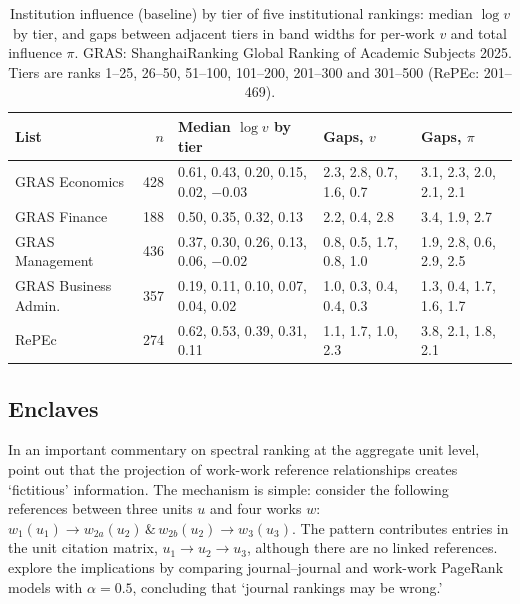 \begin{table}[!htbp]
  \centering
  \footnotesize
  \caption{Institution influence (baseline) by tier of five institutional rankings: median $\log v$ by tier, and gaps between adjacent tiers in band widths for per-work $v$ and total influence $\pi$. GRAS: ShanghaiRanking Global Ranking of Academic Subjects 2025. Tiers are ranks 1--25, 26--50, 51--100, 101--200, 201--300 and 301--500 (RePEc: 201--469).}
  \label{tab:institution_tiers}
  \setlength{\tabcolsep}{4pt}
  \begin{tabular}{@{}lrlll@{}}
    \toprule
    List & $n$ & Median $\log v$ by tier & Gaps, $v$ & Gaps, $\pi$ \\
    \midrule
    GRAS Economics          & 428 & 0.61, 0.43, 0.20, 0.15, 0.02, $-0.03$ & 2.3, 2.8, 0.7, 1.6, 0.7 & 3.1, 2.3, 2.0, 2.1, 2.1 \\
    GRAS Finance            & 188 & 0.50, 0.35, 0.32, 0.13                & 2.2, 0.4, 2.8           & 3.4, 1.9, 2.7 \\
    GRAS Management         & 436 & 0.37, 0.30, 0.26, 0.13, 0.06, $-0.02$ & 0.8, 0.5, 1.7, 0.8, 1.0 & 1.9, 2.8, 0.6, 2.9, 2.5 \\
    GRAS Business Admin.    & 357 & 0.19, 0.11, 0.10, 0.07, 0.04, 0.02   & 1.0, 0.3, 0.4, 0.4, 0.3 & 1.3, 0.4, 1.7, 1.6, 1.7 \\
    RePEc                   & 274 & 0.62, 0.53, 0.39, 0.31, 0.11         & 1.1, 1.7, 1.0, 2.3      & 3.8, 2.1, 1.8, 2.1 \\
    \bottomrule
  \end{tabular}
\end{table}

\subsection{Enclaves}

In an important commentary on spectral ranking at the aggregate unit level, \textcite{vaccarioWhenStandardNetwork2022} point out that the projection of work-work reference relationships creates `fictitious' information.  The mechanism is simple: consider the following references between three units $u$ and four works $w$: $w_1(u_1) \rightarrow w_{2a}(u_2)\, \& \, w_{2b}(u_2) \rightarrow w_3(u_3)$. The pattern contributes entries in the unit citation matrix, $u_1 \rightarrow u_2 \rightarrow u_3$, although there are no linked references. \textcite{vaccarioWhenStandardNetwork2022} explore the implications by comparing journal--journal and work-work PageRank models with $\alpha=0.5$, concluding that `journal rankings may be wrong.'

